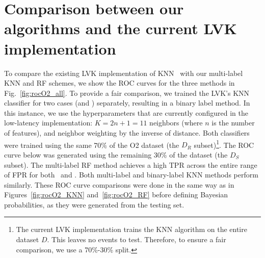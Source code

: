 \section{Comparison between our algorithms and the current LVK implementation}  \label{app:comparison}

To compare the existing \ac{LVK} implementation of \ac{KNN}~\cite{Chatterjee:2019avs} with our multi-label \ac{KNN} and \ac{RF} schemes, we show the \ac{ROC} curves for the three methods in Fig.~\ref{fig:rocO2_all}. To provide a fair comparison, we trained the LVK's \ac{KNN} classifier for two cases (\hasns and \hasrem) separately, resulting in a binary label method. In this instance, we use the hyperparameters that are currently configured in the low-latency implementation: $K = 2n + 1 = 11$ neighbors (where $n$ is the number of features), and neighbor weighting by the inverse of distance. Both classifiers were trained using the same 70\% of the \ac{O2} dataset (the $D_R$ subset)\footnote{The current LVK implementation trains the \ac{KNN} algorithm on the entire dataset $D$. This leaves no events to test. Therefore, to ensure a fair comparison, we use a 70\%-30\% split.}. The ROC curve below was generated using the remaining 30\% of the dataset (the $D_S$ subset). The multi-label RF method achieves a high \ac{TPR} across the entire range of \ac{FPR} for both \hasns\ and \hasrem. Both multi-label and binary-label \ac{KNN} methods perform similarly. These \ac{ROC} curve comparisons were done in the same way as in Figures~\ref{fig:rocO2_KNN} and~\ref{fig:rocO2_RF} before defining Bayesian probabilities, as they were generated from the testing set.

